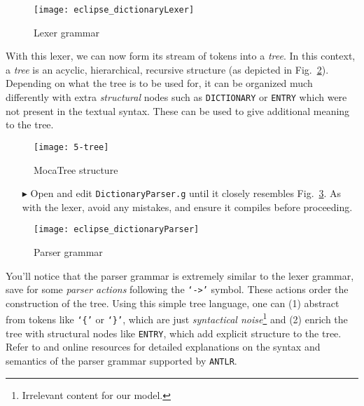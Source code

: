\begin{figure}[!htbp]
\begin{center}
  \texttt{[image: eclipse\_dictionaryLexer]}
  \caption{Lexer grammar}
  \label{eclipse:dictionaryLexer}
\end{center}
\end{figure}

With this lexer, we can now form its stream of tokens into a \emph{tree}. In this context, a \emph{tree} is an acyclic, hierarchical, recursive structure (as
depicted in Fig.~\ref{eclipse:dictLexer}). Depending on what the tree is to be used for, it can be organized much differently with extra \emph{structural} nodes
such as \texttt{DICTIONARY} or \texttt{ENTRY} which were not present in the textual syntax. These can be used to give additional meaning to the tree.

\begin{figure}[htp]
\begin{center}
 \texttt{[image: 5-tree]}
  \caption{MocaTree structure}
  \label{eclipse:dictLexer}
\end{center}
\end{figure}

\begin{itemize}

\item[$\blacktriangleright$] Open and edit \texttt{DictionaryParser.g} until it closely resembles Fig.~\ref{eclipse:dictParser}. As with the lexer, avoid any
mistakes, and ensure it compiles before proceeding.

\end{itemize}

\begin{figure}[!htbp]
\begin{center}
 \texttt{[image: eclipse\_dictionaryParser]}
  \caption{Parser grammar}
  \label{eclipse:dictParser}
\end{center}
\end{figure}

\newpage

You'll notice that the parser grammar is extremely similar to the lexer grammar, save for some \emph{parser actions} following the \texttt{`->'} symbol. These
actions order the construction of the tree. Using this simple tree language, one can (1) abstract from tokens like \texttt{`\{'} or \texttt{`\}'}, which are
just \emph{syntactical noise}\footnote{Irrelevant content for our model.} and (2) enrich the tree with structural nodes like \texttt{ENTRY}, which add explicit
structure to the tree. Refer to \cite{ANTLR} and online resources for detailed explanations on the syntax and semantics of the parser grammar supported by
\texttt{ANTLR}.


